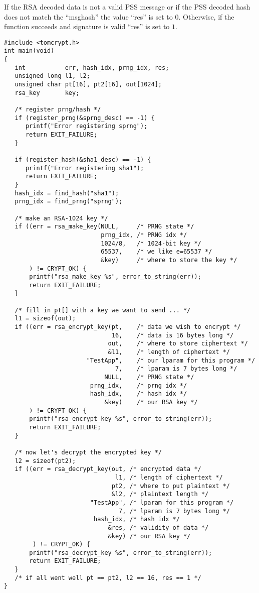 \documentclass[a4paper]{book}
\begin{document}
If the RSA decoded data is not a valid PSS message or if the PSS decoded hash does not match the ``msghash'' 
the value ``res'' is set to $0$.  Otherwise, if the function succeeds and signature is valid ``res'' is set
to $1$.

\begin{verbatim}
#include <tomcrypt.h>
int main(void)
{
   int           err, hash_idx, prng_idx, res;
   unsigned long l1, l2;
   unsigned char pt[16], pt2[16], out[1024];
   rsa_key       key;

   /* register prng/hash */
   if (register_prng(&sprng_desc) == -1) {
      printf("Error registering sprng");
      return EXIT_FAILURE;
   }

   if (register_hash(&sha1_desc) == -1) {
      printf("Error registering sha1");
      return EXIT_FAILURE;
   }
   hash_idx = find_hash("sha1");
   prng_idx = find_prng("sprng");

   /* make an RSA-1024 key */
   if ((err = rsa_make_key(NULL,     /* PRNG state */
                           prng_idx, /* PRNG idx */
                           1024/8,   /* 1024-bit key */
                           65537,    /* we like e=65537 */
                           &key)     /* where to store the key */
       ) != CRYPT_OK) {
       printf("rsa_make_key %s", error_to_string(err));
       return EXIT_FAILURE;
   }

   /* fill in pt[] with a key we want to send ... */
   l1 = sizeof(out);
   if ((err = rsa_encrypt_key(pt,    /* data we wish to encrypt */
                              16,    /* data is 16 bytes long */
                             out,    /* where to store ciphertext */
                             &l1,    /* length of ciphertext */
                       "TestApp",    /* our lparam for this program */
                               7,    /* lparam is 7 bytes long */
                            NULL,    /* PRNG state */
                        prng_idx,    /* prng idx */
                        hash_idx,    /* hash idx */
                            &key)    /* our RSA key */
       ) != CRYPT_OK) {
       printf("rsa_encrypt_key %s", error_to_string(err));
       return EXIT_FAILURE;
   }

   /* now let's decrypt the encrypted key */
   l2 = sizeof(pt2);
   if ((err = rsa_decrypt_key(out, /* encrypted data */
                               l1, /* length of ciphertext */
                              pt2, /* where to put plaintext */
                              &l2, /* plaintext length */
                        "TestApp", /* lparam for this program */
                                7, /* lparam is 7 bytes long */
                         hash_idx, /* hash idx */
                             &res, /* validity of data */
                             &key) /* our RSA key */ 
        ) != CRYPT_OK) {
       printf("rsa_decrypt_key %s", error_to_string(err));
       return EXIT_FAILURE;
   }
   /* if all went well pt == pt2, l2 == 16, res == 1 */
}
\end{verbatim}
\end{document}
